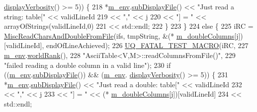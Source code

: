\begin{DoxyCode}
{{      \hyperlink{class_q_u_e_s_o_1_1_base_environment_a1fe5f244fc0316a0ab3e37463f108b96}{displayVerbosity}() >= 5)) \{
218           *\hyperlink{class_q_u_e_s_o_1_1_ascii_table_a2ba907db652aa02d53d493980d7a3753}{m\_env}.\hyperlink{class_q_u_e_s_o_1_1_base_environment_a8a0064746ae8dddfece4229b9ad374d6}{subDisplayFile}() << \textcolor{stringliteral}{"Just read a string: table["} << validLineId
219                                   << \textcolor{stringliteral}{","}                          << j
220                                   << \textcolor{stringliteral}{"] = "}                       << arrayOfStrings(validLineId,0)
221                                   << std::endl;
222         \}
223       \}
224       \textcolor{keywordflow}{else} \{
225         iRC = \hyperlink{namespace_q_u_e_s_o_a575d3153d82b7df3d78ad5cfbf2b83b7}{MiscReadCharsAndDoubleFromFile}(ifs, tmpString, &(*
      \hyperlink{class_q_u_e_s_o_1_1_ascii_table_aa25a1d14c88cd5de341c43e052622f51}{m\_doubleColumns}[j])[validLineId], endOfLineAchieved);
226         \hyperlink{_defines_8h_a56d63d18d0a6d45757de47fcc06f574d}{UQ\_FATAL\_TEST\_MACRO}(iRC,
227                             \hyperlink{class_q_u_e_s_o_1_1_ascii_table_a2ba907db652aa02d53d493980d7a3753}{m\_env}.\hyperlink{class_q_u_e_s_o_1_1_base_environment_a78b57112bbd0e6dd0e8afec00b40ffa7}{worldRank}(),
228                             \textcolor{stringliteral}{"AsciiTable<V,M>::readColumnsFromFile()"},
229                             \textcolor{stringliteral}{"failed reading a double column in a valid line"});
230         \textcolor{keywordflow}{if} ((\hyperlink{class_q_u_e_s_o_1_1_ascii_table_a2ba907db652aa02d53d493980d7a3753}{m\_env}.\hyperlink{class_q_u_e_s_o_1_1_base_environment_a8a0064746ae8dddfece4229b9ad374d6}{subDisplayFile}()) && (\hyperlink{class_q_u_e_s_o_1_1_ascii_table_a2ba907db652aa02d53d493980d7a3753}{m\_env}.
      \hyperlink{class_q_u_e_s_o_1_1_base_environment_a1fe5f244fc0316a0ab3e37463f108b96}{displayVerbosity}() >= 5)) \{
231           *\hyperlink{class_q_u_e_s_o_1_1_ascii_table_a2ba907db652aa02d53d493980d7a3753}{m\_env}.\hyperlink{class_q_u_e_s_o_1_1_base_environment_a8a0064746ae8dddfece4229b9ad374d6}{subDisplayFile}() << \textcolor{stringliteral}{"Just read a double: table["} << validLineId
232                                   << \textcolor{stringliteral}{","}                          << j
233                                   << \textcolor{stringliteral}{"] = "}                       << (*
      \hyperlink{class_q_u_e_s_o_1_1_ascii_table_aa25a1d14c88cd5de341c43e052622f51}{m\_doubleColumns}[j])[validLineId]
234                                   << std::endl;
}}
\end{DoxyCode}
